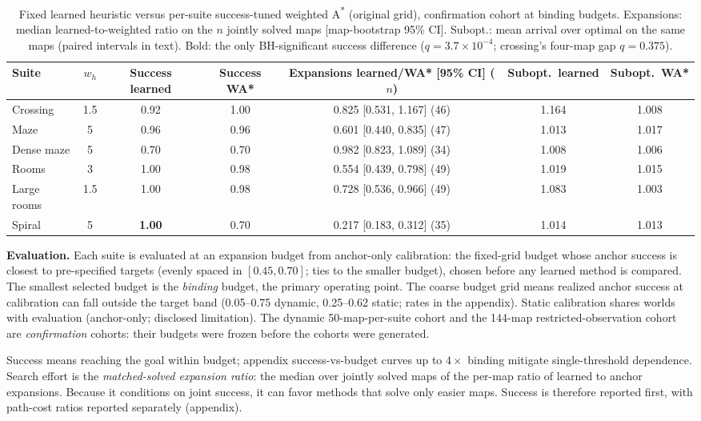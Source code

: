 \documentclass[letterpaper]{article} %
\begin{document}
\begin{table}[t]
\centering
\small
\begin{tabular}{lcccccc}
\toprule
Suite & $w_h$ & Success learned & Success WA* & Expansions learned/WA* [95\% CI] ($n$) & Subopt.\ learned & Subopt.\ WA* \\
\midrule
Crossing & 1.5 & 0.92 & 1.00 & 0.825 [0.531, 1.167] (46) & 1.164 & 1.008 \\
Maze & 5 & 0.96 & 0.96 & 0.601 [0.440, 0.835] (47) & 1.013 & 1.017 \\
Dense maze & 5 & 0.70 & 0.70 & 0.982 [0.823, 1.089] (34) & 1.008 & 1.006 \\
Rooms & 3 & 1.00 & 0.98 & 0.554 [0.439, 0.798] (49) & 1.019 & 1.015 \\
Large rooms & 1.5 & 1.00 & 0.98 & 0.728 [0.536, 0.966] (49) & 1.083 & 1.003 \\
Spiral & 5 & \textbf{1.00} & 0.70 & 0.217 [0.183, 0.312] (35) & 1.014 & 1.013 \\
\bottomrule
\end{tabular}
\caption{Fixed learned heuristic versus per-suite success-tuned weighted A\textsuperscript{*} (original grid), confirmation cohort at binding budgets. Expansions: median learned-to-weighted ratio on the $n$ jointly solved maps [map-bootstrap 95\% CI]. Subopt.: mean arrival over optimal on the same maps (paired intervals in text). Bold: the only BH-significant success difference ($q{=}3.7\times10^{-4}$; crossing's four-map gap $q{=}0.375$).}
\label{tab:wastar-main}
\end{table}

\textbf{Evaluation.} Each suite is evaluated at an expansion budget from anchor-only calibration: the fixed-grid budget whose anchor success is closest to pre-specified targets (evenly spaced in $[0.45,0.70]$; ties to the smaller budget), chosen before any learned method is compared. The smallest selected budget is the \emph{binding} budget, the primary operating point. The coarse budget grid means realized anchor success at calibration can fall outside the target band (0.05--0.75 dynamic, 0.25--0.62 static; rates in the appendix). Static calibration shares worlds with evaluation (anchor-only; disclosed limitation). The dynamic 50-map-per-suite cohort and the 144-map restricted-observation cohort are \emph{confirmation} cohorts: their budgets were frozen before the cohorts were generated.

Success means reaching the goal within budget; appendix success-vs-budget curves up to $4\times$ binding mitigate single-threshold dependence. Search effort is the \emph{matched-solved expansion ratio}: the median over jointly solved maps of the per-map ratio of learned to anchor expansions. Because it conditions on joint success, it can favor methods that solve only easier maps. Success is therefore reported first, with path-cost ratios reported separately (appendix).
\end{document}
